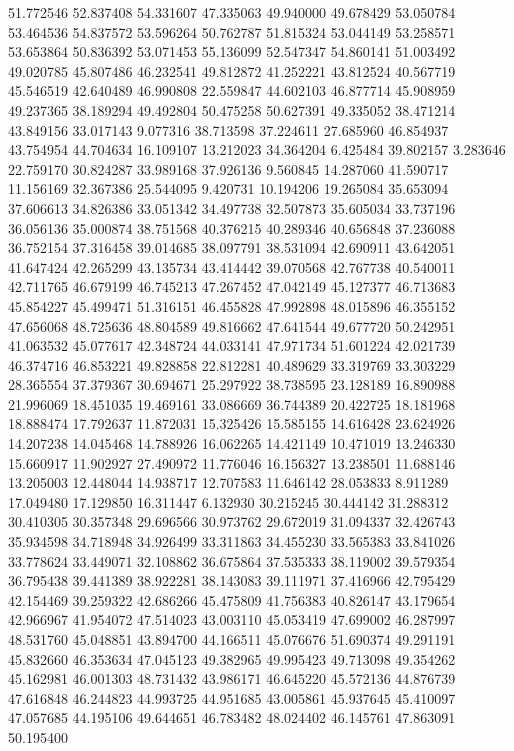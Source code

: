51.772546
52.837408
54.331607
47.335063
49.940000
49.678429
53.050784
53.464536
54.837572
53.596264
50.762787
51.815324
53.044149
53.258571
53.653864
50.836392
53.071453
55.136099
52.547347
54.860141
51.003492
49.020785
45.807486
46.232541
49.812872
41.252221
43.812524
40.567719
45.546519
42.640489
46.990808
22.559847
44.602103
46.877714
45.908959
49.237365
38.189294
49.492804
50.475258
50.627391
49.335052
38.471214
43.849156
33.017143
9.077316
38.713598
37.224611
27.685960
46.854937
43.754954
44.704634
16.109107
13.212023
34.364204
6.425484
39.802157
3.283646
22.759170
30.824287
33.989168
37.926136
9.560845
14.287060
41.590717
11.156169
32.367386
25.544095
9.420731
10.194206
19.265084
35.653094
37.606613
34.826386
33.051342
34.497738
32.507873
35.605034
33.737196
36.056136
35.000874
38.751568
40.376215
40.289346
40.656848
37.236088
36.752154
37.316458
39.014685
38.097791
38.531094
42.690911
43.642051
41.647424
42.265299
43.135734
43.414442
39.070568
42.767738
40.540011
42.711765
46.679199
46.745213
47.267452
47.042149
45.127377
46.713683
45.854227
45.499471
51.316151
46.455828
47.992898
48.015896
46.355152
47.656068
48.725636
48.804589
49.816662
47.641544
49.677720
50.242951
41.063532
45.077617
42.348724
44.033141
47.971734
51.601224
42.021739
46.374716
46.853221
49.828858
22.812281
40.489629
33.319769
33.303229
28.365554
37.379367
30.694671
25.297922
38.738595
23.128189
16.890988
21.996069
18.451035
19.469161
33.086669
36.744389
20.422725
18.181968
18.888474
17.792637
11.872031
15.325426
15.585155
14.616428
23.624926
14.207238
14.045468
14.788926
16.062265
14.421149
10.471019
13.246330
15.660917
11.902927
27.490972
11.776046
16.156327
13.238501
11.688146
13.205003
12.448044
14.938717
12.707583
11.646142
28.053833
8.911289
17.049480
17.129850
16.311447
6.132930
30.215245
30.444142
31.288312
30.410305
30.357348
29.696566
30.973762
29.672019
31.094337
32.426743
35.934598
34.718948
34.926499
33.311863
34.455230
33.565383
33.841026
33.778624
33.449071
32.108862
36.675864
37.535333
38.119002
39.579354
36.795438
39.441389
38.922281
38.143083
39.111971
37.416966
42.795429
42.154469
39.259322
42.686266
45.475809
41.756383
40.826147
43.179654
42.966967
41.954072
47.514023
43.003110
45.053419
47.699002
46.287997
48.531760
45.048851
43.894700
44.166511
45.076676
51.690374
49.291191
45.832660
46.353634
47.045123
49.382965
49.995423
49.713098
49.354262
45.162981
46.001303
48.731432
43.986171
46.645220
45.572136
44.876739
47.616848
46.244823
44.993725
44.951685
43.005861
45.937645
45.410097
47.057685
44.195106
49.644651
46.783482
48.024402
46.145761
47.863091
50.195400
